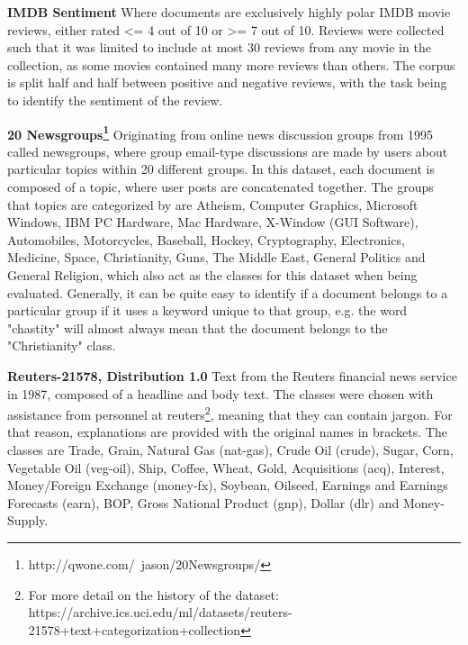 \textbf{IMDB Sentiment} Where documents are exclusively highly polar IMDB movie reviews, either rated <= 4 out of 10 or >= 7 out of 10. Reviews were collected such that it was limited to include at most 30 reviews from any movie in the collection, as some movies contained many more reviews than others. The corpus is split half and half between positive and negative reviews, with the task being to identify the sentiment of the review.

\textbf{20 Newsgroups\footnote{http://qwone.com/~jason/20Newsgroups/}} Originating from online news discussion groups from 1995 called newsgroups, where group email-type discussions are made by users about particular topics within 20 different groups. In this dataset, each document is composed of a topic, where user posts are concatenated together. The groups that topics are categorized by are Atheism, Computer Graphics, Microsoft Windows, IBM PC Hardware, Mac Hardware, X-Window (GUI Software), Automobiles, Motorcycles, Baseball, Hockey, Cryptography, Electronics, Medicine, Space, Christianity, Guns, The Middle East, General Politics and General Religion, which also act as the classes for this dataset when being evaluated. Generally, it can be quite easy to identify if a document belongs to a particular group if it uses a keyword unique to that group, e.g. the word "chastity" will almost always mean that the document belongs to the "Christianity" class.

\textbf{Reuters-21578, Distribution 1.0}  Text from the Reuters financial news service in 1987, composed of a headline and body text. The classes were chosen with assistance from personnel at reuters\footnote{For more detail on the history of the dataset: https://archive.ics.uci.edu/ml/datasets/reuters-21578+text+categorization+collection}, meaning that they can contain jargon. For that reason, explanations are provided with the original names in brackets. The classes are Trade, Grain, Natural Gas (nat-gas), Crude Oil (crude), Sugar, Corn, Vegetable Oil (veg-oil), Ship, Coffee, Wheat, Gold, Acquisitions (acq), Interest, Money/Foreign Exchange (money-fx), Soybean, Oilseed, Earnings and Earnings Forecasts (earn), BOP, Gross National Product (gnp), Dollar (dlr) and Money-Supply.   


